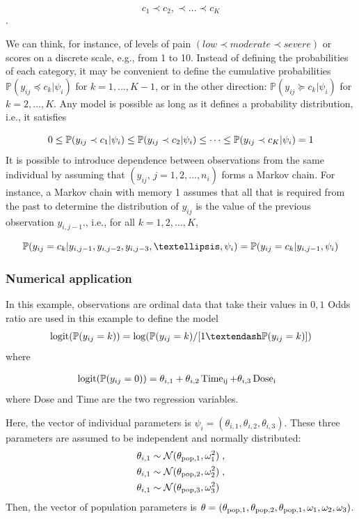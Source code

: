 $$c_1 \prec c_2,\prec \ldots \prec c_K $$.

We can think, for instance, of levels of pain $(low \prec moderate \prec severe)$ or scores on a discrete scale, e.g., from 1 to 10. Instead of defining the probabilities of each category, it may be convenient to define the cumulative probabilities $\mathbb{P}(y_{ij} \preceq c_k | \psi_i)$ for $k=1,\ldots ,K-1$, or in the other direction: $\mathbb{P}(y_{ij} \succeq c_k | \psi_i)$ for $k=2,\ldots, K$. Any model is possible as long as it defines a probability distribution, i.e., it satisfies

$$0\leq\mathbb{P}(y_{ij}\prec c_1|\psi_i)\leq\mathbb{P}(y_{ij}\prec c_2|\psi_i)\leq \cdots \leq\mathbb{P}(y_{ij}\prec c_K|\psi_i)=1$$
It is possible to introduce dependence between observations from the same individual by assuming that $(y_{ij},\,j=1,2,\ldots,n_i)$ forms a Markov chain. For instance, a Markov chain with memory 1 assumes that all that is required from the past to determine the distribution of $y_{ij}$ is the value of the previous observation $y_{i,j-1}$., i.e., for all $k=1,2,\ldots ,K$,

$$\prob(y_{ij}=c_k|y_{i,j-1},y_{i,j-2},y_{i,j-3},…,\psi_i)=\prob(y_{ij}=c_k|y_{i,j-1},\psi_i)$$

\subsubsection{Numerical application}

In this example, observations are ordinal data that take their values in ${0, 1}$
Odds ratio are used in this example to define the model
$$\logit(\prob(y_{ij} = k))= \log(\prob(y_{ij}= k) / [1–\prob(y_{ij}= k)])$$
where

\begin{align}
& \operatorname{logit}(\mathbb{P}(y_{ij} =  0))= \theta_{i,1} + \theta_{i,2} \operatorname*{Time_{ij}} + \theta_{i,3} \operatorname*{Dose_i}
\end{align}
where Dose and Time are the two regression variables. 

Here, the vector of individual parameters is $\psi_i = (\theta_{i,1},\theta_{i,2},\theta_{i,3})$. These three parameters are assumed to be independent and  normally distributed:
\begin{align} \label{indivtte}
& \theta_{i,1} \sim \mathcal{N}(\theta_{\rm pop,1}, \omega^2_{1})\;,\\
& \theta_{i,1} \sim \mathcal{N}(\theta_{\rm pop,2}, \omega^2_{2})\;,\\
& \theta_{i,1} \sim \mathcal{N}(\theta_{\rm pop,3}, \omega^2_{3})
\end{align}
Then, the vector of population parameters is $\theta = (\theta_{\rm pop,1},\theta_{\rm pop,2},\theta_{\rm pop,1}, \omega_{1}, \omega_{2} ,\omega_{3})$.

